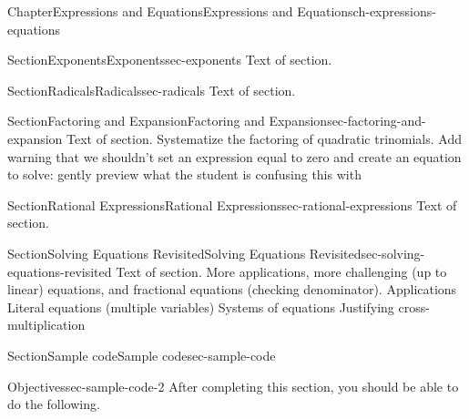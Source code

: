 \documentclass[twoside,11pt,]{book}
\numberwithin{equation}{chapter}
\begin{document}
\begin{chapterptx}{Chapter}{Expressions and Equations}{}{Expressions and Equations}{}{}{ch-expressions-equations}
\typeout{************************************************}
%
\begin{sectionptx}{Section}{Exponents}{}{Exponents}{}{}{sec-exponents}
Text of section.%
\end{sectionptx}
%
%
\typeout{************************************************}
\typeout{************************************************}
%
\begin{sectionptx}{Section}{Radicals}{}{Radicals}{}{}{sec-radicals}
Text of section.%
\end{sectionptx}
%
%
\typeout{************************************************}
\typeout{************************************************}
%
\begin{sectionptx}{Section}{Factoring and Expansion}{}{Factoring and Expansion}{}{}{sec-factoring-and-expansion}
Text of section. Systematize the factoring of quadratic trinomials. Add warning that we shouldn't set an expression equal to zero and create an equation to solve: gently preview what the student is confusing this with%
\end{sectionptx}
%
%
\typeout{************************************************}
\typeout{************************************************}
%
\begin{sectionptx}{Section}{Rational Expressions}{}{Rational Expressions}{}{}{sec-rational-expressions}
Text of section.%
\end{sectionptx}
%
%
\typeout{************************************************}
\typeout{************************************************}
%
\begin{sectionptx}{Section}{Solving Equations Revisited}{}{Solving Equations Revisited}{}{}{sec-solving-equations-revisited}
Text of section. More applications, more challenging (up to linear) equations, and fractional equations (checking denominator). Applications Literal equations (multiple variables) Systems of equations Justifying cross-multiplication%
\end{sectionptx}
%
%
\typeout{************************************************}
\typeout{************************************************}
%
\begin{sectionptx}{Section}{Sample code}{}{Sample code}{}{}{sec-sample-code}
\begin{objectives}{Objectives}{sec-sample-code-2}
After completing this section, you should be able to do the following.%

\end{objectives}
\end{sectionptx}
\end{chapterptx}
\end{document}
